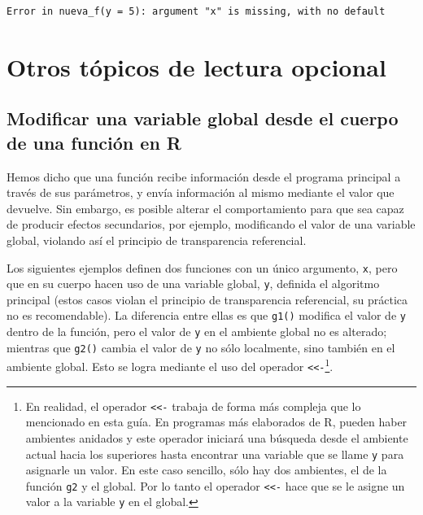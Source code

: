 \documentclass[
]{book}
\begin{document}
\begin{verbatim}
Error in nueva_f(y = 5): argument "x" is missing, with no default
\end{verbatim}

\hypertarget{otros-tuxf3picos-de-lectura-opcional}{%
\section{Otros tópicos de lectura opcional}\label{otros-tuxf3picos-de-lectura-opcional}}

\hypertarget{modificar-una-variable-global-desde-el-cuerpo-de-una-funciuxf3n-en-r}{%
\subsection{Modificar una variable global desde el cuerpo de una función en R}\label{modificar-una-variable-global-desde-el-cuerpo-de-una-funciuxf3n-en-r}}

Hemos dicho que una función recibe información desde el programa principal a través de sus parámetros, y envía información al mismo mediante el valor que devuelve. Sin embargo, es posible alterar el comportamiento para que sea capaz de producir efectos secundarios, por ejemplo, modificando el valor de una variable global, violando así el principio de transparencia referencial.

Los siguientes ejemplos definen dos funciones con un único argumento, \texttt{x}, pero que en su cuerpo hacen uso de una variable global, \texttt{y}, definida el algoritmo principal (estos casos violan el principio de transparencia referencial, su práctica no es recomendable). La diferencia entre ellas es que \texttt{g1()} modifica el valor de \texttt{y} dentro de la función, pero el valor de \texttt{y} en el ambiente global no es alterado; mientras que \texttt{g2()} cambia el valor de \texttt{y} no sólo localmente, sino también en el ambiente global. Esto se logra mediante el uso del operador \texttt{\textless{}\textless{}-}\footnote{En realidad, el operador \texttt{\textless{}\textless{}-} trabaja de forma más compleja que lo mencionado en esta guía. En programas más elaborados de R, pueden haber ambientes anidados y este operador iniciará una búsqueda desde el ambiente actual hacia los superiores hasta encontrar una variable que se llame \texttt{y} para asignarle un valor. En este caso sencillo, sólo hay dos ambientes, el de la función \texttt{g2} y el global. Por lo tanto el operador \texttt{\textless{}\textless{}-} hace que se le asigne un valor a la variable \texttt{y} en el global.}.
\end{document}
